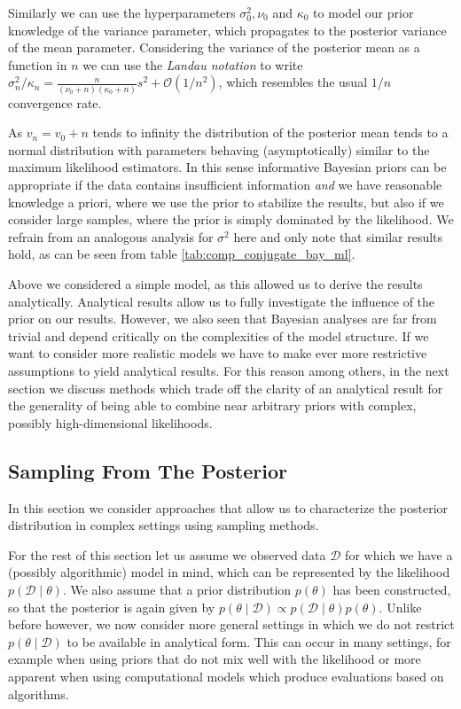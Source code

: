 Similarly we can use the hyperparameters $\sigma_0^2, \nu_0$ and $\kappa_0$ to model our prior knowledge of the variance parameter, which propagates to the posterior variance of the mean parameter.
Considering the variance of the posterior mean as a function in $n$ we can use the \emph{Landau notation} to write $\sigma_n^2 / \kappa_n =  \frac{n}{(\nu_0 + n)(\kappa_0 + n)} s^2 + \mathcal{O}(1/n^2)$, which resembles the usual $1/n$ convergence rate.

As $v_n = v_0 + n$ tends to infinity the distribution of the posterior mean tends to a normal distribution with parameters behaving (asymptotically) similar to the maximum likelihood estimators.
In this sense informative Bayesian priors can be appropriate if the data contains insufficient information \emph{and} we have reasonable knowledge a priori, where we use the prior to stabilize the results, but also if we consider large samples, where the prior is simply dominated by the likelihood.
We refrain from an analogous analysis for $\sigma^2$ here and only note that similar results hold, as can be seen from table \ref{tab:comp_conjugate_bay_ml}.

Above we considered a simple model, as this allowed us to derive the results analytically.
Analytical results allow us to fully investigate the influence of the prior on our results.
However, we also seen that Bayesian analyses are far from trivial and depend critically on the complexities of the model structure.
If we want to consider more realistic models we have to make ever more restrictive assumptions to yield analytical results.
For this reason among others, in the next section we discuss methods which trade off the clarity of an analytical result for the generality of being able to combine near arbitrary priors with complex, possibly high-dimensional likelihoods.

\subsection{Sampling From The Posterior}
In this section we consider approaches that allow us to characterize the posterior distribution in complex settings using sampling methods.

For the rest of this section let us assume we observed data $\mathcal{D}$ for which we have a (possibly algorithmic) model in mind, which can be represented by the likelihood $p(\mathcal{D} \mid \theta)$.
We also assume that a prior distribution $p(\theta)$ has been constructed, so that the posterior is again given by $p(\theta \mid \mathcal{D}) \propto p(\mathcal{D} \mid \theta) p(\theta)$.
Unlike before however, we now consider more general settings in which we do not restrict $p(\theta \mid \mathcal{D})$ to be available in analytical form.
This can occur in many settings, for example when using priors that do not mix well with the likelihood or more apparent when using computational models which produce evaluations based on algorithms.

